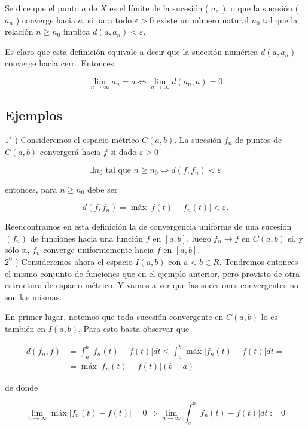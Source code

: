 \documentclass[10pt]{article}
\theoremstyle{plain}
\theoremstyle{definition}
\theoremstyle{remark}
\begin{document}
Se dice que el punto $a$ de $X$ es el límite de la sucesión ( $a_{n}$ ), o que la sucesión ( $a_{n}$ ) converge hacia $a$, si para todo $\varepsilon>0$ existe un número natural $n_{0}$ tal que la relación $n \geqslant n_{0}$ implica $d\left(a, a_{n}\right)<\varepsilon$.

Es claro que esta definición equivale a decir que la sucesión numérica $d\left(a, a_{n}\right)$ converge hacia cero. Entonces

$$
\lim _{n \rightarrow \infty} a_{n}=a \Longleftrightarrow \lim _{n \rightarrow \infty} d\left(a_{n}, a\right)=0
$$

\subsection{Ejemplos}
$1^{\circ}$ ) Consideremos el espacio métrico $C(a, b)$. La sucesión $f_{n}$ de puntos de $C(a, b)$ convergerá hacia $f$ si dado $\varepsilon>0$

$$
\exists n_{0} \text { tal que } n \geqslant n_{0} \Rightarrow d\left(f, f_{n}\right)<\varepsilon
$$

entonces, para $n \geqslant n_{0}$ debe ser

$$
d\left(f, f_{n}\right)=\operatorname{máx}\left|f(t)-f_{n}(t)\right|<\varepsilon .
$$

Reencontramos en esta definición la de convergencia uniforme de una sucesión $\left(f_{n}\right)$ de funciones hacia una función $f$ en $[a, b]$, luego $f_{n} \rightarrow f$ en $C(a, b)$ si, y sólo si, $f_{n}$ converge uniformemente hacia $f$ en $[a, b]$.\\
$2^{0}$ ) Consideremos ahora el espacio $I(a, b)$ con $a<b \in R$. Tendremos entonces el mismo conjunto de funciones que en el ejemplo anterior, pero provisto de otra estructura de espacio métrico. Y vamos a ver que las sucesiones convergentes no son las mismas.

En primer lugar, notemos que toda sucesión convergente en $C(a, b)$ lo es también en $I(a, b)$, Para esto basta observar que

$$
\begin{aligned}
d\left(f_{n}, f\right) & =\int_{a}^{b}\left|f_{n}(t)-f(t)\right| d t \leqslant \int_{a}^{b} \operatorname{máx}\left|f_{n}(t)-f(t)\right| d t= \\
& =\operatorname{máx}\left|f_{n}(t)-f(t)\right|(b-a)
\end{aligned}
$$

de donde

$$
\lim _{n \rightarrow \infty} \operatorname{máx}\left|f_{n}(t)-f(t)\right|=0 \Rightarrow \lim _{n \rightarrow \infty} \int_{a}^{b}\left|f_{n}(t)-f(t)\right| d t:=0
$$
\end{document}
